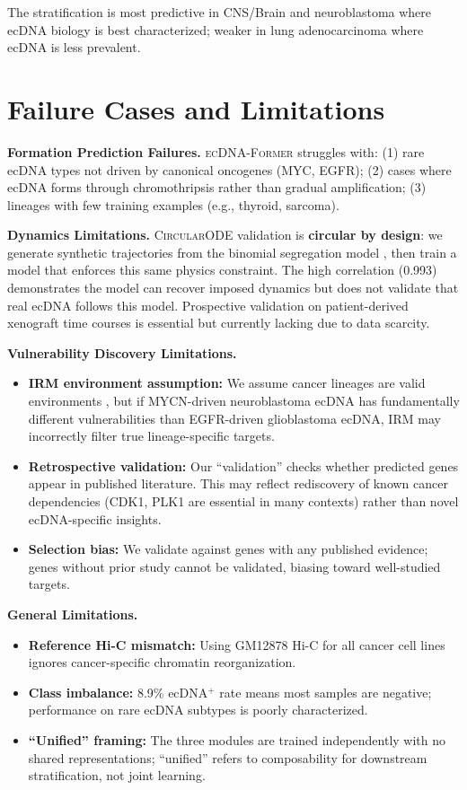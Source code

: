 \documentclass[sigconf,anonymous]{acmart}
\newcommand{\former}{\textsc{ecDNA-Former}}
\newcommand{\circularode}{\textsc{CircularODE}}
\begin{document}
The stratification is most predictive in CNS/Brain and neuroblastoma where ecDNA biology is best characterized; weaker in lung adenocarcinoma where ecDNA is less prevalent.


\section{Failure Cases and Limitations}
\label{app:limitations}

\textbf{Formation Prediction Failures.} \former{} struggles with: (1) rare ecDNA types not driven by canonical oncogenes (MYC, EGFR); (2) cases where ecDNA forms through chromothripsis \cite{shoshani_2021_chromothripsis} rather than gradual amplification; (3) lineages with few training examples (e.g., thyroid, sarcoma).

\textbf{Dynamics Limitations.} \circularode{} validation is \textbf{circular by design}: we generate synthetic trajectories from the binomial segregation model \cite{lange_2022_mathematical}, then train a model that enforces this same physics constraint. The high correlation (0.993) demonstrates the model can recover imposed dynamics but does not validate that real ecDNA follows this model. Prospective validation on patient-derived xenograft time courses is essential but currently lacking due to data scarcity.

\textbf{Vulnerability Discovery Limitations.}
\begin{itemize}[leftmargin=*, itemsep=2pt]
    \item \textbf{IRM environment assumption:} We assume cancer lineages are valid environments \cite{rosenfeld_2021_irm_risks}, but if MYCN-driven neuroblastoma ecDNA has fundamentally different vulnerabilities than EGFR-driven glioblastoma ecDNA, IRM may incorrectly filter true lineage-specific targets.
    \item \textbf{Retrospective validation:} Our ``validation'' checks whether predicted genes appear in published literature. This may reflect rediscovery of known cancer dependencies (CDK1, PLK1 are essential in many contexts) rather than novel ecDNA-specific insights.
    \item \textbf{Selection bias:} We validate against genes with any published evidence; genes without prior study cannot be validated, biasing toward well-studied targets.
\end{itemize}

\textbf{General Limitations.}
\begin{itemize}[leftmargin=*, itemsep=2pt]
    \item \textbf{Reference Hi-C mismatch:} Using GM12878 Hi-C for all cancer cell lines ignores cancer-specific chromatin reorganization.
    \item \textbf{Class imbalance:} 8.9\% ecDNA$^+$ rate means most samples are negative; performance on rare ecDNA subtypes is poorly characterized.
    \item \textbf{``Unified'' framing:} The three modules are trained independently with no shared representations; ``unified'' refers to composability for downstream stratification, not joint learning.
\end{itemize}
\end{document}
